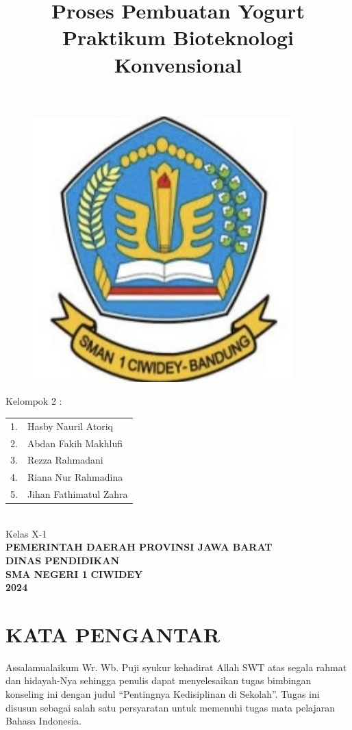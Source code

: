 \documentclass[f4paper,12pt, left=3cm,right=2cm,bottom=2cm, bahasa]{article}
\date{}
\title{Proses Pembuatan Yogurt\\ Praktikum Bioteknologi Konvensional}
\begin{document}
\maketitle
\thispagestyle{empty}
\begin{figure}[ht]
    \centering
    \includegraphics[width=0.3\linewidth]{images/sman1.png}
\end{figure}

\begin{center}
    Kelompok 2 : \\
    \begin{tabular}{ll}
         1.& Hasby Nauril Atoriq  \\
         2.& Abdan Fakih Makhlufi \\
         3.& Rezza Rahmadani \\
         4.& Riana Nur Rahmadina \\
         5.& Jihan Fathimatul Zahra\\
    \end{tabular}\\
    \vspace{0.5cm}
    Kelas X-1\\
    \vspace{1cm}
    \textbf{PEMERINTAH DAERAH PROVINSI JAWA BARAT}\\
    \textbf{DINAS PENDIDIKAN}\\
    \textbf{SMA NEGERI 1}
    \textbf{CIWIDEY}\\
    \textbf{2024}
\end{center}
\pagebreak
\onehalfspacing{}
\section*{KATA PENGANTAR}
\setcounter{section}{1}


Assalamualaikum Wr. Wb. Puji syukur kehadirat Allah SWT atas segala rahmat dan hidayah-Nya sehingga penulis dapat menyelesaikan tugas bimbingan konseling ini dengan judul “Pentingnya Kedisiplinan di Sekolah”. Tugas ini disusun sebagai salah satu persyaratan untuk memenuhi tugas mata pelajaran Bahasa Indonesia. 
\end{document}
